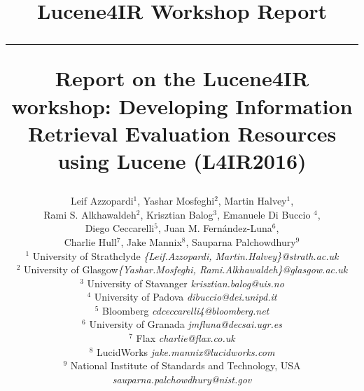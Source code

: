 \documentclass[12pt]{article}
\begin{document}
\title{\vspace{-2.5cm}
\begin{center}
\textbf{\small{Lucene4IR Workshop Report}}\\\vspace{-0.5cm} \rule{17.5cm}{1pt}
\end{center}
\vspace{1cm}\textbf{Report on the Lucene4IR workshop: Developing Information Retrieval Evaluation Resources using Lucene (L4IR2016) }}

\newcommand{\todo}[1]{\textcolor{red}{#1}}
\author{
Leif Azzopardi$^{1}$, Yashar Mosfeghi$^{2}$, Martin Halvey$^{1}$, \\
 Rami S. Alkhawaldeh$^{2}$, Krisztian Balog$^{3}$, Emanuele Di Buccio $^{4}$, \\
Diego Ceccarelli$^{5}$, Juan M. Fern\'andez-Luna$^{6}$,\\
 Charlie Hull$^{7}$, Jake Mannix$^{8}$, Sauparna Palchowdhury$^{9}$\\ 
    $^{1}$ {\small University of Strathclyde  \emph{ \{Leif.Azzopardi, Martin.Halvey\}@strath.ac.uk}}\\
    $^{2}$ {\small University of Glasgow\emph{\small {\{Yashar.Mosfeghi, Rami.Alkhawaldeh\}@glasgow.ac.uk}}}\\
	$^{3}$ {\small University of Stavanger \emph{\small krisztian.balog@uis.no}}\\
	$^{4}$ {\small University of Padova \emph{\small dibuccio@dei.unipd.it}}\\
	$^{5}$ {\small Bloomberg \emph{\small cdceccarelli4@bloomberg.net}}\\	
	$^{6}$ {\small University of Granada \emph{\small jmfluna@decsai.ugr.es}}\\
	$^{7}$ {\small Flax \emph{\small charlie@flax.co.uk}}\\
	$^{8}$ {\small LucidWorks \emph{\small jake.mannix@lucidworks.com}}\\
	$^{9}$ {\small National Institute of Standards and Technology, USA \emph{\small sauparna.palchowdhury@nist.gov}}
}
\end{document}

